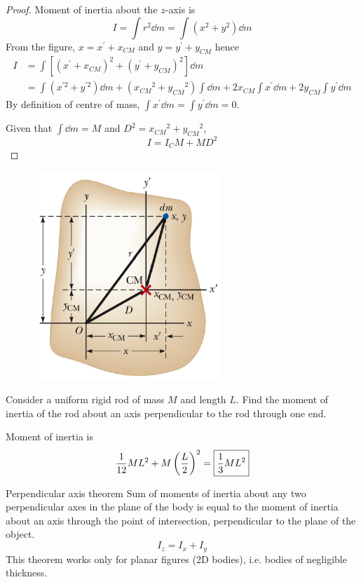 \begin{proof}
Moment of inertia about the $z$-axis is 
\[ I=\int r^2 \dd{m} = \int (x^2+y^2)\dd{m} \]
From the figure, $x=x^\prime+x_{CM}$ and $y=y^\prime+y_{CM}$ hence
\begin{align*}
I &= \int \left[(x^\prime+x_{CM})^2 + (y^\prime+y_{CM})^2\right] \dd{m} \\
&= \int (x^{\prime 2}+y^{\prime 2}) \dd{m} + ({x_{CM}}^2+{y_{CM}}^2) \int \dd{m} + 2x_{CM} \int x^\prime \dd{m} + 2y_{CM} \int y^\prime \dd{m}
\end{align*}
By definition of centre of mass, $\int x^\prime \dd{m} = \int y^\prime \dd{m} = 0$.

Given that $\int\dd{m}=M$ and $D^2={x_{CM}}^2+{y_{CM}}^2$,
\[ \boxed{I=I_CM+MD^2} \]
\end{proof}
\begin{figure}[H]
    \centering
    \includegraphics[width=7cm]{images/Parallel_axis_theorem2.png}
\end{figure}

\begin{exmp}{}{}
Consider a uniform rigid rod of mass $M$ and length $L$. Find the moment of inertia of the rod about an axis perpendicular to the rod through one end.
\end{exmp}

\begin{solution}
Moment of inertia is 
\[ \frac{1}{12}ML^2 + M\left(\frac{L}{2}\right)^2 = \boxed{\frac{1}{3}ML^2} \]
\end{solution}

\begin{thrm}{Perpendicular axis theorem}{}
Sum of moments of inertia about any two perpendicular axes in the plane of the body is equal to the moment of inertia about an axis through the point of intersection, perpendicular to the plane of the object.
\begin{equation}
I_z = I_x + I_y
\end{equation}
This theorem works only for planar figures (2D bodies), i.e. bodies of negligible thickness.
\end{thrm}

